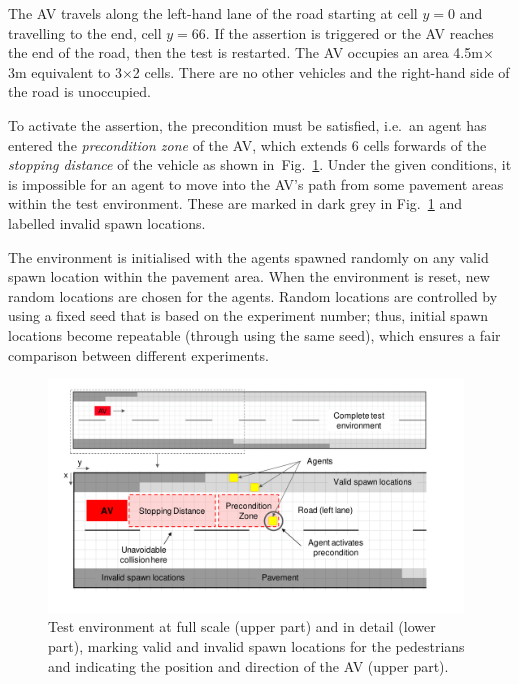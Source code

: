 \documentclass[runningheads,a4paper]{llncs}
\begin{document}
The AV travels along the left-hand lane of the road starting at cell $y=0$ and travelling to the end, cell $y=66$. If the assertion is triggered
or the AV reaches the end of the road, then the test is restarted. The AV occupies an area 4.5m$\times$3m equivalent to 3$\times$2 cells. There are no other vehicles and the right-hand side of the road is unoccupied.

To activate the assertion, the precondition must be satisfied, i.e.\ an agent has entered the \textit{precondition zone} of the AV, which extends 6 cells forwards of the \textit{stopping distance} of the vehicle as shown in~Fig.~\ref{gridRoad}. Under the given conditions, it is impossible for an agent to move into the AV's path from some pavement areas within the test environment. These are marked in dark grey in Fig.~\ref{gridRoad} and labelled invalid spawn locations. 

The environment is initialised with the agents spawned randomly on any valid spawn location within the pavement area. When the environment is reset, new random locations are chosen for the agents. Random locations are controlled by using a fixed seed that is based on the experiment number; thus, initial spawn locations become repeatable (through using the same seed), which ensures a fair comparison between different experiments.

\begin{figure}[!t]
	\centering
\includegraphics[width=0.98\textwidth]{RoadLayout.pdf}
	\caption{Test environment at full scale (upper part) and in detail (lower part), marking valid and invalid spawn locations for the pedestrians and indicating the position and direction of the AV (upper part).}
	\label{gridRoad}
\end{figure}


\end{document}
